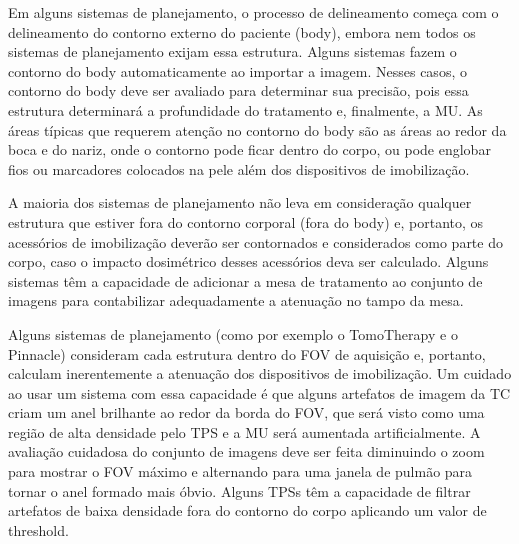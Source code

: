 \documentclass[11pt,a4paper]{article}
\newcounter{exemplo}
\begin{document}
	Em alguns sistemas de planejamento, o processo de delineamento começa com o delineamento do contorno  externo do paciente (body), embora nem todos os sistemas de planejamento exijam essa estrutura. Alguns sistemas fazem o contorno do body automaticamente ao importar a imagem. Nesses casos,  o contorno do body deve ser avaliado para determinar sua precisão, pois essa estrutura determinará a profundidade do tratamento e, finalmente, a MU. As áreas típicas que requerem atenção no contorno do body são as áreas ao redor da boca e do nariz, onde o contorno pode ficar dentro do corpo, ou pode englobar fios ou marcadores colocados na pele além dos dispositivos de imobilização. 

	A maioria dos sistemas de planejamento não leva em consideração qualquer estrutura que estiver fora do contorno corporal (fora do body) e, portanto, os acessórios de imobilização deverão ser contornados e considerados como parte do corpo, caso o impacto dosimétrico desses acessórios deva ser calculado. Alguns sistemas têm a capacidade de adicionar a mesa de tratamento ao conjunto de imagens para contabilizar adequadamente a atenuação no tampo da mesa.

	Alguns sistemas de planejamento (como por exemplo o TomoTherapy e o Pinnacle) consideram cada estrutura dentro do FOV de aquisição e, portanto, calculam inerentemente a atenuação dos dispositivos de imobilização. Um cuidado ao usar um sistema com essa capacidade é que alguns artefatos de imagem da TC criam um anel brilhante ao redor da borda do FOV, que será visto como uma região de alta densidade pelo TPS e a MU será aumentada artificialmente. A avaliação cuidadosa do conjunto de imagens deve ser feita diminuindo o zoom para mostrar o FOV máximo e alternando para uma janela de pulmão para tornar o anel formado mais óbvio. Alguns TPSs têm a capacidade de filtrar artefatos de baixa densidade fora do contorno do corpo aplicando um valor de threshold.


\end{document}
